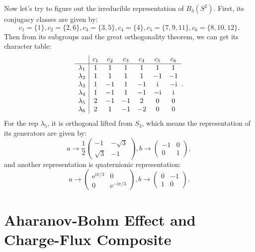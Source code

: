 \documentclass{book}
\begin{document}
Now let's try to figure out the irreducible representation of $B_{3} (S^{2} )$. First, its conjugacy classes are given by:
\begin{equation*}
c_{1} =\{1\},c_{2} =\{2,6\},c_{3} =\{3,5\},c_{4} =\{4\},c_{5} =\{7,9,11\},c_{6} =\{8,10,12\}.
\end{equation*}
Then from its subgroups and the great orthogonality theorem, we can get its character table:
\begin{equation*}
\begin{array}{ c|c c c c c c }
 & c_{1} & c_{2} & c_{3} & c_{4} & c_{5} & c_{6}\\
\hline
\lambda _{1} & 1 & 1 & 1 & 1 & 1 & 1\\
\lambda _{2} & 1 & 1 & 1 & 1 & -1 & -1\\
\lambda _{3} & 1 & -1 & 1 & -1 & \mathrm{i} & -\mathrm{i}\\
\lambda _{4} & 1 & -1 & 1 & -1 & -\mathrm{i} & \mathrm{i}\\
\lambda _{5} & 2 & -1 & -1 & 2 & 0 & 0\\
\lambda _{6} & 2 & 1 & -1 & -2 & 0 & 0
\end{array} .
\end{equation*}
For the rep $\lambda _{5}$, it is orthogonal lifted from $S_{3}$, which means the representation of its generators are given by:
\begin{equation*}
a\rightarrow \frac{1}{2}\begin{pmatrix}
-1 & -\sqrt{3}\\
\sqrt{3} & -1
\end{pmatrix} ,b\rightarrow \begin{pmatrix}
-1 & 0\\
0 & 1
\end{pmatrix} ,
\end{equation*}
and another representation is quaternionic representation:
\begin{equation*}
a\rightarrow \begin{pmatrix}
\mathrm{e}^{\mathrm{i} \pi /3} & 0\\
0 & \mathrm{e}^{-\mathrm{i} \pi /3}
\end{pmatrix} ,b\rightarrow \begin{pmatrix}
0 & -1\\
1 & 0
\end{pmatrix} .
\end{equation*}

\chapter{Aharanov-Bohm Effect and Charge-Flux Composite}
\end{document}
